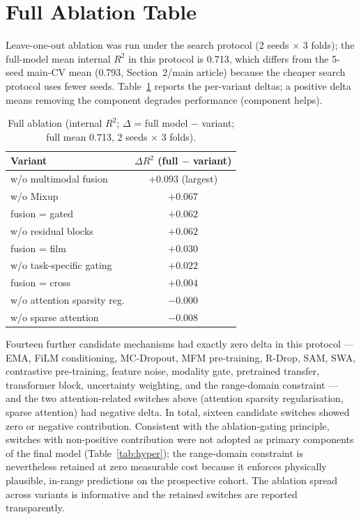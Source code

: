\documentclass[utf8]{frontiers_suppmat}
\begin{document}
\section{Full Ablation Table}

Leave-one-out ablation was run under the search protocol (2 seeds $\times$ 3
folds); the full-model mean internal $R^2$ in this protocol is 0.713, which
differs from the 5-seed main-CV mean (0.793, Section~2/main article) because
the cheaper search protocol uses fewer seeds. Table~\ref{tab:abl} reports the
per-variant deltas; a positive delta means removing the component degrades
performance (component helps).

\begin{table}[h]
\centering
\caption{Full ablation (internal $R^2$; $\Delta$ = full model $-$ variant; full mean 0.713, 2 seeds $\times$ 3 folds).}
\label{tab:abl}
\begin{tabular}{lc}
\toprule
Variant & $\Delta R^2$ (full $-$ variant) \\
\midrule
w/o multimodal fusion & $+0.093$ (largest) \\
w/o Mixup & $+0.067$ \\
fusion = gated & $+0.062$ \\
w/o residual blocks & $+0.062$ \\
fusion = film & $+0.030$ \\
w/o task-specific gating & $+0.022$ \\
fusion = cross & $+0.004$ \\
w/o attention sparsity reg. & $-0.000$ \\
w/o sparse attention & $-0.008$ \\
\bottomrule
\end{tabular}
\end{table}

Fourteen further candidate mechanisms had exactly zero delta in this
protocol --- EMA, FiLM conditioning, MC-Dropout, MFM pre-training, R-Drop,
SAM, SWA, contrastive pre-training, feature noise, modality gate, pretrained
transfer, transformer block, uncertainty weighting, and the range-domain
constraint --- and the two attention-related switches above (attention
sparsity regularisation, sparse attention) had negative delta. In total,
sixteen candidate switches showed zero or negative contribution. Consistent
with the ablation-gating principle, switches with non-positive contribution
were not adopted as primary components of the final model
(Table~\ref{tab:hyper}); the range-domain constraint is nevertheless retained
at zero measurable cost because it enforces physically plausible, in-range
predictions on the prospective cohort. The ablation spread across variants is
informative and the retained switches are reported transparently.
\end{document}
